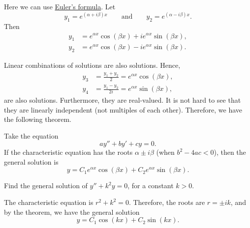 \documentclass[12pt]{book}
\begin{document}
Here we can use \hyperref[eulersformula]{Euler's formula}.  Let
\begin{equation*}
y_1 = e^{(\alpha+i\beta)x} \qquad \text{and} \qquad y_2 = e^{(\alpha-i\beta)x} .
\end{equation*}
Then 
\begin{align*}
y_1 & = e^{\alpha x} \cos (\beta x) + i e^{\alpha x} \sin (\beta x) , \\
y_2 & = e^{\alpha x} \cos (\beta x) - i e^{\alpha x} \sin (\beta x) .
\end{align*}

Linear combinations of solutions are also solutions.  Hence,
\begin{align*}
y_3 & = \frac{y_1 + y_2}{2} = e^{\alpha x} \cos (\beta x) , \\ 
y_4 & = \frac{y_1 - y_2}{2i} = e^{\alpha x} \sin (\beta x) ,
\end{align*}
are also solutions.  Furthermore, they are real-valued.  It is not hard to
see that they are linearly independent (not multiples of each other).
Therefore, we have the following theorem.

\begin{theorem}
Take the equation
\begin{equation*}
ay'' + by' + cy = 0 .
\end{equation*}
If the characteristic equation has the roots $\alpha \pm i \beta$
(when $b^2 - 4ac < 0$),
then the general solution is
\begin{equation*}
y = C_1 e^{\alpha x} \cos (\beta x) + C_2 e^{\alpha x} \sin (\beta x) .
\end{equation*}
\end{theorem}

\begin{example}
Find the general solution of $y'' + k^2 y = 0$, for a constant
$k > 0$.

The characteristic equation is $r^2 + k^2 = 0$.  Therefore,
the roots are $r = \pm ik$, and by the theorem, we have the general solution
\begin{equation*}
y = C_1 \cos (kx) + C_2 \sin (kx) .
\end{equation*}
\end{example}
\end{document}
